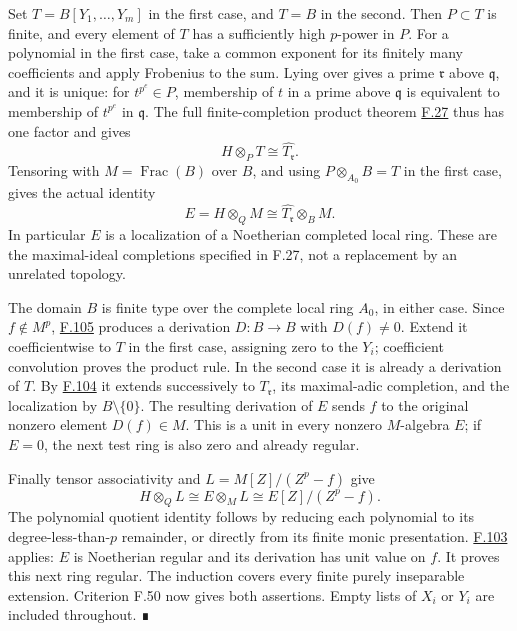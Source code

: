 \documentclass[11pt,a4paper,openany]{report}
\begin{document}
Set \(T=B[Y_1,\ldots,Y_m]\) in the first case, and \(T=B\) in the second. Then \(P\subset T\) is finite, and every element of \(T\) has a sufficiently high \(p\)-power in \(P\). For a polynomial in the first case, take a common exponent for its finitely many coefficients and apply Frobenius to the sum. Lying over gives a prime \(\mathfrak r\) above \(\mathfrak q\), and it is unique: for \(t^{p^e}\in P\), membership of \(t\) in a prime above \(\mathfrak q\) is equivalent to membership of \(t^{p^e}\) in \(\mathfrak q\). The full finite-completion product theorem \hyperref[AG-RG-S05-algebra-lemma-completion-finite-extension]{F.27} thus has one factor and gives \[H\otimes_PT\cong\widehat{T_{\mathfrak r}}.\] Tensoring with \(M=\operatorname{Frac}(B)\) over \(B\), and using \(P\otimes_{A_0}B=T\) in the first case, gives the actual identity \[E=H\otimes_QM\cong\widehat{T_{\mathfrak r}}\otimes_BM.\] In particular \(E\) is a localization of a Noetherian completed local ring. These are the maximal-ideal completions specified in F.27, not a replacement by an unrelated topology.

The domain \(B\) is finite type over the complete local ring \(A_0\), in either case. Since \(f\notin M^p\), \hyperref[AG-RG-S05-more-algebra-lemma-find-D]{F.105} produces a derivation \(D:B\to B\) with \(D(f)\ne0\). Extend it coefficientwise to \(T\) in the first case, assigning zero to the \(Y_i\); coefficient convolution proves the product rule. In the second case it is already a derivation of \(T\). By \hyperref[AG-RG-S05-more-algebra-lemma-derivation-extends]{F.104} it extends successively to \(T_{\mathfrak r}\), its maximal-adic completion, and the localization by \(B\setminus\{0\}\). The resulting derivation of \(E\) sends \(f\) to the original nonzero element \(D(f)\in M\). This is a unit in every nonzero \(M\)-algebra \(E\); if \(E=0\), the next test ring is also zero and already regular.

Finally tensor associativity and \(L=M[Z]/(Z^p-f)\) give \[H\otimes_QL\cong E\otimes_ML\cong E[Z]/(Z^p-f).\] The polynomial quotient identity follows by reducing each polynomial to its degree-less-than-\(p\) remainder, or directly from its finite monic presentation. \hyperref[AG-RG-S05-more-algebra-lemma-degree-p-extension-regular]{F.103} applies: \(E\) is Noetherian regular and its derivation has unit value on \(f\). It proves this next ring regular. The induction covers every finite purely inseparable extension. Criterion F.50 now gives both assertions. Empty lists of \(X_i\) or \(Y_i\) are included throughout. ∎
\end{document}
